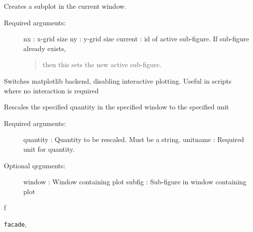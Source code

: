 \documentclass[letterpaper,10pt,english]{sphinxmanual}
\begin{document}

\begin{fulllineitems}
\label{index:facade.subfigure}
Creates a subplot in the current window.
\begin{description}
\item[{Required arguments:}] \leavevmode
nx         : x-grid size
ny         : y-grid size
current    : id of active sub-figure.  If sub-figure already exists,
\begin{quote}

then this sets the new active sub-figure.
\end{quote}

\end{description}

\end{fulllineitems}


\begin{fulllineitems}
\label{index:facade.switch_nongui}
Switches matplotlib backend, disabling interactive plotting.
Useful in scripts where no interaction is required

\end{fulllineitems}


\begin{fulllineitems}
\label{index:facade.rescale}
Rescales the specified quantity in the specified window to the specified unit
\begin{description}
\item[{Required arguments:}] \leavevmode
quantity   : Quantity to be rescaled.  Must be a string.
unitname   : Required unit for quantity.

\item[{Optional qrguments:}] \leavevmode
window     : Window containing plot
subfig     : Sub-figure in window containing plot

\end{description}

\end{fulllineitems}



\renewcommand{\indexname}{Python Module Index}
\begin{theindex}
\def\bigletter#1{{\Large\sffamily#1}\nopagebreak\vspace{1mm}}
\bigletter{f}
\item {\texttt{facade}}, \pageref{index:module-facade}
\end{theindex}

\renewcommand{\indexname}{Index}
\printindex
\end{document}
